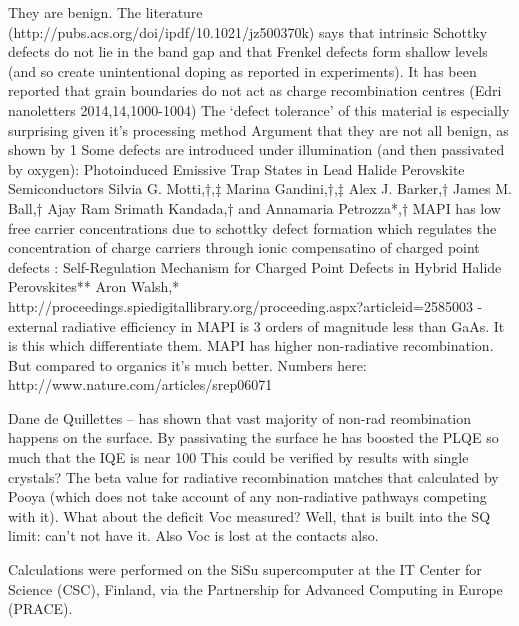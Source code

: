 They are benign. The literature (http://pubs.acs.org/doi/ipdf/10.1021/jz500370k) says that intrinsic Schottky defects do not lie in the band gap and that Frenkel defects form shallow levels (and so create unintentional doping as reported in experiments). 
It has been reported that grain boundaries do not act as charge recombination centres (Edri nanoletters 2014,14,1000-1004)
The `defect tolerance’ of this material is especially surprising given it’s processing method
Argument that they are not all benign, as shown by 1%
Some defects are introduced under illumination (and then passivated by oxygen): Photoinduced Emissive Trap States in Lead Halide Perovskite Semiconductors Silvia G. Motti,†,‡ Marina Gandini,†,‡ Alex J. Barker,† James M. Ball,† Ajay Ram Srimath Kandada,† and Annamaria Petrozza*,† 
MAPI has low free carrier concentrations due to schottky defect formation which regulates the concentration of charge carriers through ionic compensatino of charged point defects : Self-Regulation Mechanism for Charged Point Defects in Hybrid Halide Perovskites** Aron Walsh,* 
http://proceedings.spiedigitallibrary.org/proceeding.aspx?articleid=2585003 - external radiative efficiency in MAPI is 3 orders of magnitude less than GaAs. It is this which differentiate them. MAPI has higher non-radiative recombination. But compared to organics it’s much better. Numbers here: http://www.nature.com/articles/srep06071

Dane de Quillettes – has shown that vast majority of non-rad reombination happens on the surface. By passivating the surface he has boosted the PLQE so much that the IQE is near 100%
This could be verified by results with single crystals?
The beta value for radiative recombination matches that calculated by Pooya (which does not take account of any non-radiative pathways competing with it).
What about the deficit Voc measured? Well, that is built into the SQ limit: can’t not have it. Also Voc is lost at the contacts also.


Calculations were performed on the SiSu supercomputer at the IT Center for Science (CSC), Finland, via the Partnership for Advanced Computing in Europe (PRACE).